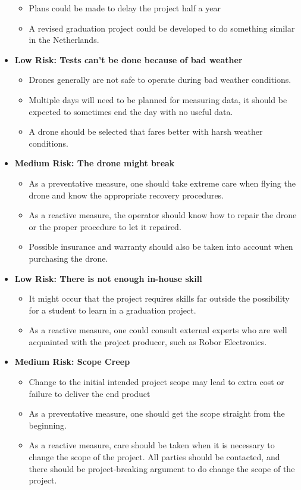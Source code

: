 \documentclass[11pt, a4paper]{article}
\begin{document}
\begin{itemize}
\begin{itemize}
            \item Plans could be made to delay the project half a year
            \item A revised graduation project could be developed to do something similar in the Netherlands.
          \end{itemize}
    \item \textbf{Low Risk: Tests can't be done because of bad weather}
          \begin{itemize} 
            \item Drones generally are not safe to operate during bad weather conditions.
            \item Multiple days will need to be planned for measuring data, it should be expected to sometimes end the day with no useful data.
            \item A drone should be selected that fares better with harsh weather conditions.
          \end{itemize}
    \item \textbf{Medium Risk: The drone might break}
          \begin{itemize} 
            \item As a preventative measure, one should take extreme care when flying the drone and know the appropriate recovery procedures.
            \item As a reactive measure, the operator should know how to repair the drone or the proper procedure to let it repaired.
            \item Possible insurance and warranty should also be taken into account when purchasing the drone.
          \end{itemize}
    \item \textbf{Low Risk: There is not enough in-house skill}
          \begin{itemize} 
            \item It might occur that the project requires skills far outside the possibility for a student to learn in a graduation project.
            \item As a reactive measure, one could consult external experts who are well acquainted with the project producer, such as Robor Electronics. \cite{robor}
          \end{itemize}
    \item \textbf{Medium Risk: Scope Creep}
          \begin{itemize} 
            \item Change to the initial intended project scope may lead to extra cost or failure to deliver the end product
            \item As a preventative measure, one should get the scope straight from the beginning.
            \item As a reactive measure, care should be taken when it is necessary to change the scope of the project. All parties should be contacted, and there should be project-breaking argument to do change the scope of the project.
          \end{itemize}
\end{itemize}
\pagebreak
\printbibliography 
\end{document}

